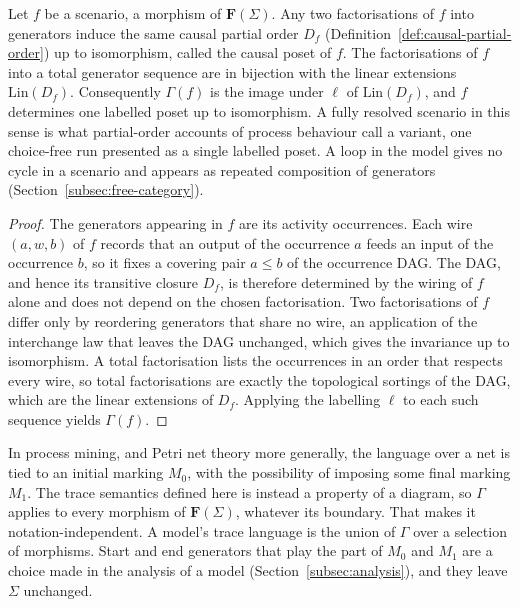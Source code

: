 \begin{proposition}\label{prop:scenario-normal-form}
Let $f$ be a scenario, a morphism of $\mathbf{F}(\Sigma)$. Any two factorisations of $f$ into generators induce the same causal partial order $D_f$ (Definition~\ref{def:causal-partial-order}) up to isomorphism, called the causal poset of $f$. The factorisations of $f$ into a total generator sequence are in bijection with the linear extensions $\mathrm{Lin}(D_f)$. Consequently $\Gamma(f)$ is the image under $\ell$ of $\mathrm{Lin}(D_f)$, and $f$ determines one labelled poset up to isomorphism. A fully resolved scenario in this sense is what partial-order accounts of process behaviour call a variant, one choice-free run presented as a single labelled poset. A loop in the model gives no cycle in a scenario and appears as repeated composition of generators (Section~\ref{subsec:free-category}).
\end{proposition}
\begin{proof}
The generators appearing in $f$ are its activity occurrences. Each wire $(a,w,b)$ of $f$ records that an output of the occurrence $a$ feeds an input of the occurrence $b$, so it fixes a covering pair $a\le b$ of the occurrence DAG. The DAG, and hence its transitive closure $D_f$, is therefore determined by the wiring of $f$ alone and does not depend on the chosen factorisation. Two factorisations of $f$ differ only by reordering generators that share no wire, an application of the interchange law that leaves the DAG unchanged, which gives the invariance up to isomorphism. A total factorisation lists the occurrences in an order that respects every wire, so total factorisations are exactly the topological sortings of the DAG, which are the linear extensions of $D_f$. Applying the labelling $\ell$ to each such sequence yields $\Gamma(f)$.
\end{proof}

\begin{remark}
In process mining, and Petri net theory more generally, the language over a net is tied to an initial marking $M_0$, with the possibility of imposing some final marking $M_1$. The trace semantics defined here is instead a property of a diagram, so $\Gamma$ applies to every morphism of $\mathbf{F}(\Sigma)$, whatever its boundary. That makes it notation-independent. A model's trace language is the union of $\Gamma$ over a selection of morphisms. Start and end generators that play the part of $M_0$ and $M_1$ are a choice made in the analysis of a model (Section~\ref{subsec:analysis}), and they leave $\Sigma$ unchanged.
\end{remark}

